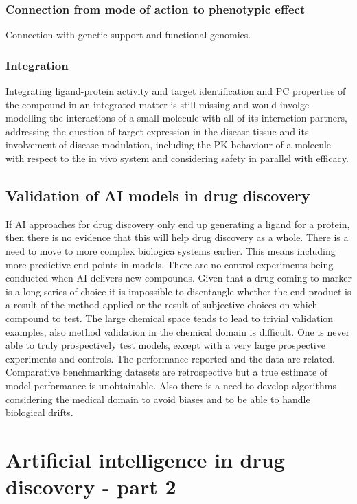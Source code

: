 		\subsubsection{Connection from mode of action to phenotypic effect}
		Connection with genetic support and functional genomics.

		\subsubsection{Integration}
		Integrating ligand-protein activity and target identification and PC properties of the compound in an integrated matter is still missing and would involge modelling the interactions of a small molecule with all of its interaction partners, addressing the question of target expression in the disease tissue and its involvement of disease modulation, including the PK behaviour of a molecule with respect to the in vivo system and considering safety in parallel with efficacy.

	\subsection{Validation of AI models in drug discovery}
	If AI approaches for drug discovery only end up generating a ligand for a protein, then there is no evidence that this will help drug discovery as a whole.
	There is a need to move to more complex biologica systems earlier.
	This means including more predictive end points in models.
	There are no control experiments being conducted when AI delivers new compounds.
	Given that a drug coming to marker is a long series of choice it is impossible to disentangle whether the end product is a result of the method applied or the result of subjective choices on which compound to test.
	The large chemical space tends to lead to trivial validation examples, also method validation in the chemical domain is difficult.
	One is never able to truly prospectively test models, except with a very large prospective experiments and controls.
	The performance reported and the data are related.
	Comparative benchmarking datasets are retrospective but a true estimate of model performance is unobtainable.
	Also there is a need to develop algorithms considering the medical domain to avoid biases and to be able to handle biological drifts.

\section{Artificial intelligence in drug discovery - part 2}

